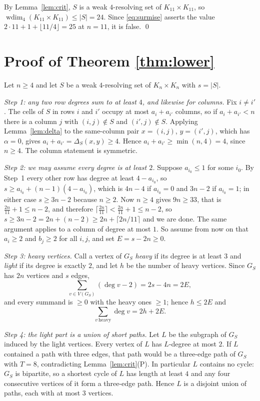 \documentclass[11pt]{amsart}
\theoremstyle{remark}
\DeclareMathOperator{\wdim}{wdim}
\begin{document}
By Lemma~\ref{lem:crit}, $S$ is a weak $4$-resolving set of
$K_{11}\times K_{11}$, so $\wdim_4(K_{11}\times K_{11})\le\lvert S\rvert=24$.
Since \eqref{eq:surmise} asserts the value $2\cdot11+1+\lfloor11/4\rfloor=25$
at $n=11$, it is false. \qed

\section{Proof of Theorem \ref{thm:lower}}\label{sec:lower}

Let $n\ge4$ and let $S$ be a weak $4$-resolving set of $K_n\times K_n$ with
$s=\lvert S\rvert$.

\emph{Step 1: any two row degrees sum to at least $4$, and likewise for
columns.} Fix $i\ne i'$. The cells of $S$ in rows $i$ and $i'$ occupy at most
$a_i+a_{i'}$ columns, so if $a_i+a_{i'}<n$ there is a column $j$ with
$(i,j)\notin S$ and $(i',j)\notin S$. Applying Lemma~\ref{lem:delta} to the
same-column pair $x=(i,j)$, $y=(i',j)$, which has $\alpha=0$, gives
$a_i+a_{i'}=\Delta_S(x,y)\ge4$. Hence $a_i+a_{i'}\ge\min(n,4)=4$, since
$n\ge4$. The column statement is symmetric.

\emph{Step 2: we may assume every degree is at least $2$.} Suppose
$a_{i_0}\le1$ for some $i_0$. By Step~1 every other row has degree at least
$4-a_{i_0}$, so $s\ge a_{i_0}+(n-1)(4-a_{i_0})$, which is $4n-4$ if
$a_{i_0}=0$ and $3n-2$ if $a_{i_0}=1$; in either case $s\ge3n-2$ because
$n\ge2$. Now $n\ge4$ gives $9n\ge33$, that is $\frac{2n}{11}+1\le n-2$, and
therefore $\lceil\frac{2n}{11}\rceil<\frac{2n}{11}+1\le n-2$, so
$s\ge3n-2=2n+(n-2)\ge2n+\lceil2n/11\rceil$ and we are done. The same argument
applies to a column of degree at most $1$. So assume from now on that
$a_i\ge2$ and $b_j\ge2$ for all $i,j$, and set $E=s-2n\ge0$.

\emph{Step 3: heavy vertices.} Call a vertex of $G_S$ \emph{heavy} if its
degree is at least $3$ and \emph{light} if its degree is exactly $2$, and let
$h$ be the number of heavy vertices. Since $G_S$ has $2n$ vertices and $s$
edges,
\[
  \sum_{v\in V(G_S)}(\deg v-2)=2s-4n=2E ,
\]
and every summand is $\ge0$ with the heavy ones $\ge1$; hence $h\le 2E$ and
\begin{equation}\label{eq:heavydeg}
  \sum_{v\ \mathrm{heavy}}\deg v=2h+2E .
\end{equation}

\emph{Step 4: the light part is a union of short paths.} Let $L$ be the
subgraph of $G_S$ induced by the light vertices. Every vertex of $L$ has
$L$-degree at most $2$. If $L$ contained a path with three edges, that path
would be a three-edge path of $G_S$ with $T=8$, contradicting
Lemma~\ref{lem:crit}(P). In particular $L$ contains no cycle: $G_S$ is
bipartite, so a shortest cycle of $L$ has length at least $4$ and any four
consecutive vertices of it form a three-edge path. Hence $L$ is a disjoint
union of paths, each with at most $3$ vertices.
\end{document}
